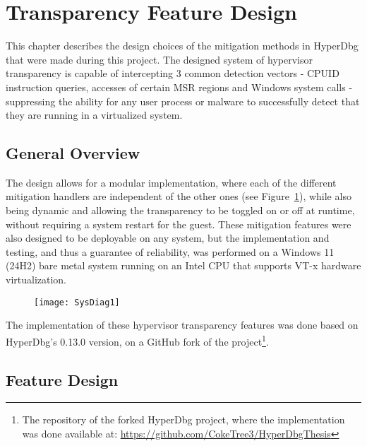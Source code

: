 \section{Transparency Feature Design}\label{s:design}

This chapter describes the design choices of the mitigation methods in HyperDbg that were made during this project. The designed system of hypervisor transparency is capable of intercepting 3 common detection vectors - CPUID instruction queries, accesses of certain MSR regions and Windows system calls - 
suppressing the ability for any user process or malware to successfully detect that they are running in a virtualized system.

\subsection{General Overview}
The design allows for a modular implementation, where each of the different mitigation handlers are independent of the other ones (see Figure~\ref{fig:feature_diagram}), 
while also being dynamic and allowing the transparency to be toggled on or off at runtime, without requiring a system restart for the guest.
These mitigation features were also designed to be deployable on any system, but the implementation and testing, and thus a guarantee of reliability, 
was performed on a Windows 11 (24H2) bare metal system running on an Intel CPU that supports VT-x hardware virtualization. 

\begin{figure}[tbh]
    \texttt{[image: SysDiag1]}
    \label{fig:feature_diagram}
\end{figure}

The implementation of these hypervisor transparency features was done based on HyperDbg's 0.13.0 version, on a GitHub fork of the 
project\footnote{The repository of the forked HyperDbg project, where the implementation was done available at: \url{https://github.com/CokeTree3/HyperDbgThesis}}.


\subsection{Feature Design}
